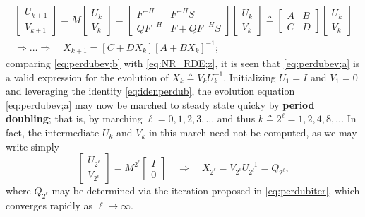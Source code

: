 \begin{subequations}
\label{eq:perdubev}
\begin{gather}
\begin{bmatrix} U_{k+1} \\ V_{k+1} \end{bmatrix} = M \begin{bmatrix} U_{k} \\ V_{k} \end{bmatrix}
   = \begin{bmatrix} F^{-H} & F^{-H}S \\ Q F^{-H} & F+ Q F^{-H}S \end{bmatrix} \begin{bmatrix} U_{k} \\ V_{k} \end{bmatrix}
   \triangleq \begin{bmatrix} A & B \\ C & D \end{bmatrix}\begin{bmatrix} U_{k} \\ V_{k} \end{bmatrix} \label{eq:perdubev;a} \\
\Rightarrow \ldots \Rightarrow \quad X_{k+1}=[C+D X_k][A+B X_k]^{-1}; \label{eq:perdubev;b}
\end{gather}
\end{subequations}
comparing \eqref{eq:perdubev;b} with \eqref{eq:NR_RDE;z}, it is seen that \eqref{eq:perdubev;a} is a valid expression for the evolution of $X_k \triangleq V_k U_k^{-1}$.  Initializing $U_1=I$ and $V_1=0$ and leveraging the identity \eqref{eq:idenperdub}, the
evolution equation \eqref{eq:perdubev;a} may now be marched to steady state quicky by {\bf period doubling}; that is,
by marching $\ell=0,1,2,3,\ldots$ and thus $k\triangleq 2^\ell=1,2,4,8,\ldots$
In fact, the intermediate $U_k$ and $V_k$ in this march need not be computed, as we may write simply
\begin{equation*}
\begin{bmatrix} U_{2^\ell} \\ V_{2^\ell} \end{bmatrix} = M^{2^\ell} \begin{bmatrix} I \\ 0 \end{bmatrix} \quad \Rightarrow \quad X_{2^\ell} = V_{2^\ell} U_{2^\ell}^{-1} = Q_{2^\ell},
\end{equation*}
where $Q_{2^\ell}$ may be determined via the iteration proposed in \eqref{eq:perdubiter}, which converges rapidly as $\ell \rightarrow \infty$.

